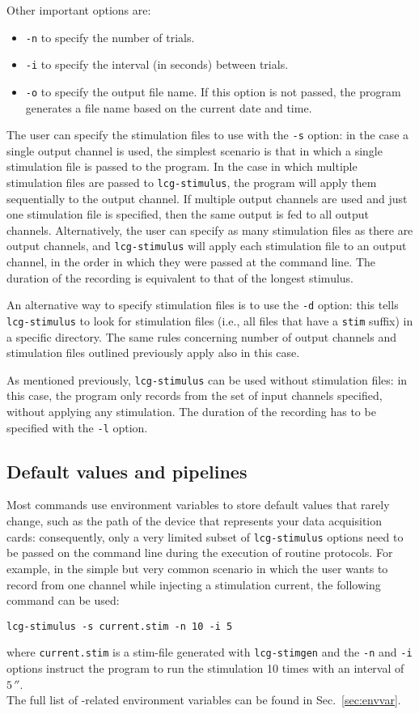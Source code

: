 Other important options are:
\begin{itemize}
\item \verb+-n+ to specify the number of trials.
\item \verb+-i+ to specify the interval (in seconds) between trials.
\item \verb+-o+ to specify the output file name. If this option is not
  passed, the program generates a file name based on the current date
  and time.
\end{itemize}

The user can specify the stimulation files to use with the \verb+-s+
option: in the case a single output channel is used, the simplest
scenario is that in which a single stimulation file is passed to the
program. In the case in which multiple stimulation files are passed to
\verb+lcg-stimulus+, the program will apply them sequentially to the
output channel. If multiple output channels are used and just one
stimulation file is specified, then the same output is fed to all
output channels. Alternatively, the user can specify as many
stimulation files as there are output channels, and
\verb+lcg-stimulus+ will apply each stimulation file to an output
channel, in the order in which they were passed at the command
line. The duration of the recording is equivalent to that of the
longest stimulus.

An alternative way to specify stimulation files is to use the
\verb+-d+ option: this tells \verb+lcg-stimulus+ to look for
stimulation files (i.e., all files that have a \verb+stim+ suffix) in
a specific directory. The same rules concerning number of output
channels and stimulation files outlined previously apply also in this
case.

As mentioned previously, \verb+lcg-stimulus+ can be used without
stimulation files: in this case, the program only records from the set
of input channels specified, without applying any stimulation. The
duration of the recording has to be specified with the \verb+-l+
option.

\subsection{Default values and pipelines}
Most \progname commands use environment variables to store default
values that rarely change, such as the path of the device that
represents your data acquisition cards: consequently, only a very
limited subset of \verb+lcg-stimulus+ options need to be passed on the
command line during the execution of routine protocols. For example,
in the simple but very common scenario in which the user wants to
record from one channel while injecting a stimulation current, the
following command can be used:
\begin{lstlisting}
lcg-stimulus -s current.stim -n 10 -i 5
\end{lstlisting}
where \verb+current.stim+ is a stim-file generated with
\verb+lcg-stimgen+ and the \verb+-n+ and \verb+-i+ options instruct
the program to run the stimulation 10 times with an interval of
$5\,\second$. \\
The full list of \progname-related environment variables can be found
in Sec.~\ref{sec:envvar}.

